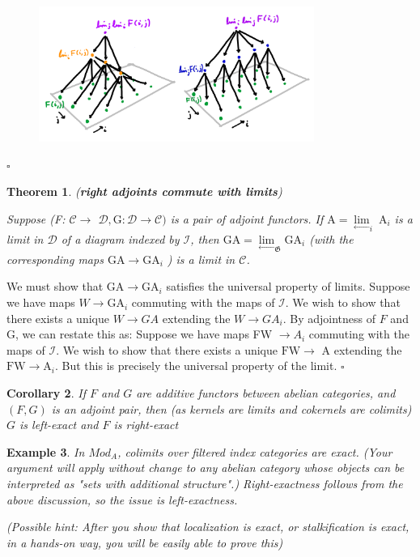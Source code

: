 \documentclass{article}
\newtheorem{theorem}{Theorem}[section]
\newtheorem{corollary}[theorem]{Corollary}
\newtheorem{example}[theorem]{Example}
\newenvironment{Proof}{{\noindent \indent \it Proof:\quad}}{\hfill $\square$\par}
\begin{document}
\begin{Proof}
    \begin{figure}[htp]
    \centering
    \includegraphics[width=9cm]{4.png}
    \label{fig:4}
    \end{figure}
    
\end{Proof}
\begin{theorem}
(\textbf{right adjoints commute with limits})

Suppose (F: $\mathscr{C} \rightarrow$ $\mathscr{D}, \mathrm{G}: \mathscr{D} \rightarrow \mathscr{C})$ is a pair of adjoint functors. If $\mathrm{A}={\lim \limits_{\longleftarrow}} _{i} \mathrm{~A}_{i}$ is a limit in $\mathscr{D}$ of a diagram indexed by $\mathscr{I}$, then $\mathrm{GA}={\lim \limits_{\longleftarrow}} _{\mathfrak{G}} \mathrm{GA}_{i}$ (with the corresponding maps $\mathrm{GA} \rightarrow \mathrm{GA}_{i}$ ) is a limit in $\mathscr{C}$.
\end{theorem}
\begin{Proof}
    We must show that $\mathrm{GA} \rightarrow \mathrm{GA}_{i}$ satisfies the universal property of limits. Suppose we have maps $W \rightarrow \mathrm{GA}_{i}$ commuting with the maps of $\mathscr{I}$. We wish to show that there exists a unique $W \rightarrow G A$ extending the $W \rightarrow G A_{i}$. By adjointness of $F$ and G, we can restate this as: Suppose we have maps FW $\rightarrow A_{i}$ commuting with the maps of $\mathscr{I}$. We wish to show that there exists a unique $\mathrm{FW} \rightarrow$ A extending the $\mathrm{FW} \rightarrow \mathrm{A}_{i}$. But this is precisely the universal property of the limit.
\end{Proof}
\begin{corollary}
If $F$ and $G$ are additive functors between abelian categories, and $(F, G)$ is an
adjoint pair, then (as kernels are limits and cokernels are colimits) $G$ is left-exact
and $F$ is right-exact
\end{corollary}
\begin{example}
    In $Mod_{A}$, colimits over filtered index categories are exact. (Your argument will apply without change to any abelian category whose objects can be interpreted as "sets with additional structure".) Right-exactness follows from the above discussion, so the issue is left-exactness. 

     (Possible hint:
After you show that localization is exact, or stalkification is exact, in a hands-on way, you will be easily able to prove this)
\end{example}
\end{document}
